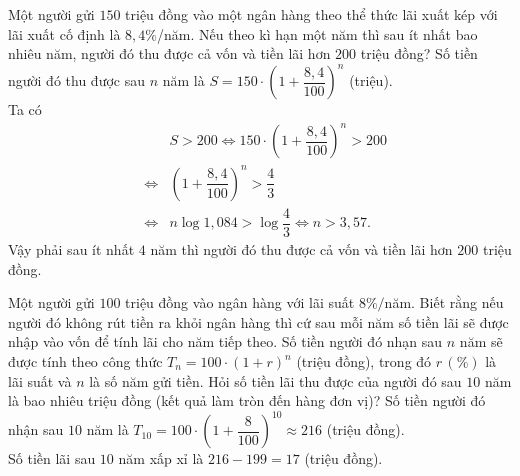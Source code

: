 \begin{bt}%

	Một người gửi $150$ triệu đồng vào một ngân hàng theo thể thức lãi xuất kép với lãi xuất cố định là $8{,}4\%$/năm. Nếu theo kì hạn một năm thì sau ít nhất bao nhiêu năm, người đó thu được cả vốn và tiền lãi hơn $200$ triệu đồng?
	\loigiai
	{
		Số tiền người đó thu được sau $n$ năm là $S=150\cdot{\left(1+\dfrac{8{,}4}{100}\right)^n}$ (triệu).\\
		Ta có 
		\begin{eqnarray*}
			& & S>200\Leftrightarrow 150 \cdot{\left(1+\dfrac{8,4}{100}\right)^n}>200\\
			&\Leftrightarrow &{\left(1+\dfrac{8,4}{100}\right)^n}>\dfrac{4}{3}\\
			&\Leftrightarrow& n\log 1,084>\log \dfrac{4}{3}\Leftrightarrow n>3{,}57.
		\end{eqnarray*}
		Vậy phải sau ít nhất $4$ năm thì người đó thu được cả vốn và tiền lãi hơn $200$ triệu đồng.
	}
\end{bt}

\begin{bt}%

	Một người gửi $100$ triệu đồng vào ngân hàng với lãi suất $8\%/$năm. Biết rằng nếu người đó không rút tiền ra khỏi ngân hàng thì cứ sau mỗi năm số tiền lãi sẽ được nhập vào vốn để tính lãi cho năm tiếp theo. Số tiền người đó nhạn sau $n$ năm sẽ được tính theo công thức $T_n=100\cdot (1+r)^{n}$ (triệu đồng), trong đó $r\,(\%)$ là lãi suất và $n$ là số năm gửi tiền.
	Hỏi số tiền lãi thu được của người đó sau $10$ năm là bao nhiêu triệu đồng (kết quả làm tròn đến hàng đơn vị)?
	\loigiai
	{
		Số tiền người đó nhận sau $10$ năm là $T_{10}=100\cdot\left (1+\dfrac{8}{100} \right )^{10}\approx 216$ (triệu đồng).\\
		Số tiền lãi sau $10$ năm xấp xỉ là $216-199=17$ (triệu đồng).
	} 
\end{bt}

